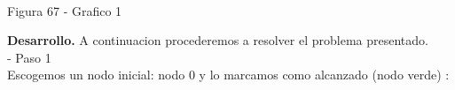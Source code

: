 \documentclass[12pt,twoside]{article}
\begin{document}
\begin{center}
\begin{tikzpicture}[x=0.75pt,y=0.75pt,yscale=-1,xscale=1]
\end{tikzpicture}
    \\ Figura 67 - Grafico 1
\end{center}
\textbf{Desarrollo.}
A continuacion procederemos a resolver el problema presentado. \\
- Paso 1 \\
Escogemos un nodo inicial: nodo 0 y lo marcamos como alcanzado (nodo verde) :
\begin{center}



\begin{tikzpicture}[x=0.75pt,y=0.75pt,yscale=-1,xscale=1]


\end{tikzpicture}
\end{center}
\end{document}
